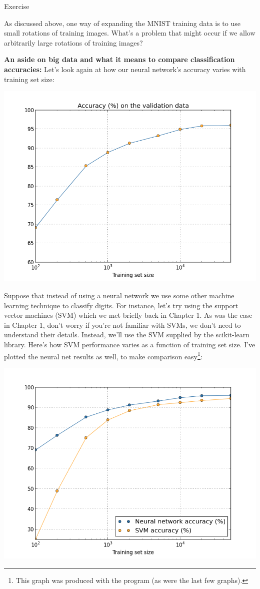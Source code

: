 \documentclass[a4paper,twoside,10pt]{book}
\begin{document}
\begin{exercize}{Exercise}
	\item As discussed above, one way of expanding the MNIST training data is to use small rotations of training images. What's a problem that might occur if we allow arbitrarily large rotations of training images?
\end{exercize}
\textbf{An aside on big data and what it means to compare classification accuracies:} Let's look again at how our neural network's accuracy varies with training set size:
\begin{center}
	\includegraphics[width=0.6\linewidth]{figures/ch3/more_data_log}
\end{center}
Suppose that instead of using a neural network we use some other machine learning technique to classify digits. For instance, let's try using the support vector machines (SVM) which we met briefly back in Chapter 1. As was the case in Chapter 1, don't worry if you're not familiar with SVMs, we don't need to understand their details. Instead, we'll use the SVM supplied by the scikit-learn library. Here's how SVM performance varies as a function of training set size. I've plotted the neural net results as well, to make comparison easy\footnote{This graph was produced with the program  (as were the last few graphs).}:
\begin{center}
	\includegraphics[width=0.6\linewidth]{figures/ch3/more_data_comparison}
\end{center}
\end{document}
